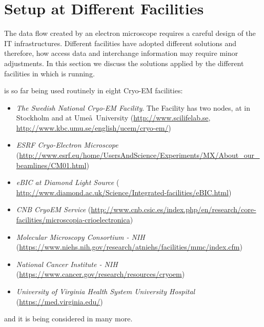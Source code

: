 \section{\scipion Setup at Different Facilities}

The data flow created by an electron microscope requires a careful design of the IT infrastructures.  Different facilities have adopted different solutions and therefore, how \scipion  access data and interchange information may require minor adjustments. In this section we discuss  the  solutions applied by the different facilities in which \scipion is running.

\scipion is so far being used routinely in eight Cryo-EM facilities:
\begin{itemize}
 \itemsep0em 

 \item \emph{The Swedish National Cryo-EM Facility}. The Facility has two nodes, at \scilifelab in Stockholm and at Ume\aa\ University (\url{http://www.scilifelab.se}, \url{http://www.kbc.umu.se/english/ucem/cryo-em/})
 \item \emph{ESRF Cryo-Electron Microscope} (\url{http://www.esrf.eu/home/UsersAndScience/Experiments/MX/About_our_beamlines/CM01.html})
 \item \emph{eBIC at Diamond Light Source} ( \url{http://www.diamond.ac.uk/Science/Integrated-facilities/eBIC.html})
 \item \emph{CNB CryoEM Service} (\url{http://www.cnb.csic.es/index.php/en/research/core-facilities/microscopia-crioelectronica})
 \item \emph{Molecular Microscopy Consortium - NIH} (\url{https://www.niehs.nih.gov/research/atniehs/facilities/mmc/index.cfm})
 \item \emph{National Cancer Institute - NIH} (\url{https://www.cancer.gov/research/resources/cryoem})
 \item \emph{University of Virginia Health System University Hospital} (\url{https://med.virginia.edu/})
 
\end{itemize}
and it is being considered in many more.

